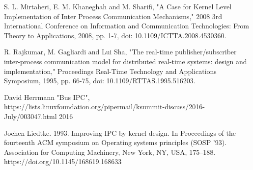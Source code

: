 \documentclass[12pt]{report}
\begin{document}
	\begin{thebibliography}{9}
	
		S. L. Mirtaheri, E. M. Khaneghah and M. Sharifi, 
		"A Case for Kernel Level Implementation of Inter Process Communication Mechanisms," 
		2008 3rd International Conference on Information and Communication Technologies: From Theory to Applications, 
		2008, pp. 1-7, doi: 10.1109/ICTTA.2008.4530360.
	
		R. Rajkumar, M. Gagliardi and Lui Sha, 
		"The real-time publisher/subscriber inter-process communication model for distributed real-time systems: design and implementation," 
		Proceedings Real-Time Technology and Applications Symposium, 
		1995, pp. 66-75, doi: 10.1109/RTTAS.1995.516203. 

		David Herrmann
		"Bus IPC", https://lists.linuxfoundation.org/pipermail/ksummit-discuss/2016-July/003047.html
		2016
		
		Jochen Liedtke. 1993. 
		Improving IPC by kernel design. In Proceedings of the fourteenth ACM symposium on Operating systems principles (SOSP '93). 
		Association for Computing Machinery, 
		New York, NY, USA, 175–188. 
		https://doi.org/10.1145/168619.168633

	\end{thebibliography}

    
\end{document}
